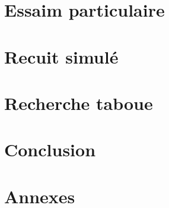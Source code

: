 \documentclass{librairies/lib}
\begin{document}
    


    \newpage

    \section{Essaim particulaire}\label{sec:essaim-particulaire}

    


    \newpage

    \section{Recuit simulé}\label{sec:recuit-simule}

    


    \newpage

    \section{Recherche taboue}\label{sec:recherche-taboue}

    


    \newpage



    \section{Conclusion}\label{sec:conclusion}

    

    \newpage




    \section*{Annexes}





    \printglossaries


    \newpage

    \listoffigures




    \newpage



    
    
\end{document}
